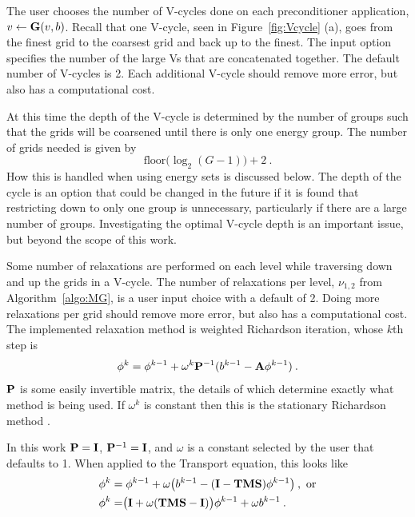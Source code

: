 The user chooses the number of V-cycles done on each preconditioner application, $v \leftarrow \mathbf{G}(v,b)$. Recall that one V-cycle, seen in Figure~\ref{fig:Vcycle} (a), goes from the finest grid to the coarsest grid and back up to the finest. The input option specifies the number of the large Vs that are concatenated together. The default number of V-cycles is 2. Each additional V-cycle should remove more error, but also has a computational cost. 

At this time the depth of the V-cycle is determined by the number of groups such that the grids will be coarsened until there is only one energy group. The number of grids needed is given by \cite{BinaryTree2011}
\begin{equation}
  \text{floor}\bigl( \log_{2}(G-1) \bigr) + 2 \:.
  \label{eq:NumGrids}
\end{equation}
%
How this is handled when using energy sets is discussed below. The depth of the cycle is an option that could be changed in the future if it is found that restricting down to only one group is unnecessary, particularly if there are a large number of groups. Investigating the optimal V-cycle depth is an important issue, but beyond the scope of this work. 

Some number of relaxations are performed on each level while traversing down and up the grids in a V-cycle. The number of relaxations per level, $\nu_{1,2}$ from Algorithm~\ref{algo:MG}, is a user input choice with a default of 2. Doing more relaxations per grid should remove more error, but also has a computational cost. The implemented relaxation method is weighted Richardson iteration, whose $k$th step is
%
\begin{equation}
  \phi^{k} = \phi^{k-1} + \omega^{k}\mathbf{P}^{-1}(b^{k-1} - \mathbf{A}\phi^{k-1}) \:.
  \label{eq:Richardson}
\end{equation}
%
$\mathbf{P}$ is some easily invertible matrix, the details of which determine exactly what method is being used. If $\omega^{k}$ is constant then this is the stationary Richardson method \cite{Moore1999}. 

In this work $\mathbf{P} = \mathbf{I}$, $\mathbf{P}^{-1} = \mathbf{I}$, and $\omega$ is a constant selected by the user that defaults to 1. When applied to the Transport equation, this looks like
%
\begin{align}
  \phi^{k} &= \phi^{k-1} + \omega\bigr(b^{k-1} - (\mathbf{I} - \mathbf{TMS})\phi^{k-1}\bigl) \:, \text{ or} \nonumber \\
  \phi^{k} &= \bigr(\mathbf{I} + \omega(\mathbf{TMS} - \mathbf{I})\bigl)\phi^{k-1} + \omega b^{k-1} \:.
  \label{eq:relax}
 \end{align}
  
